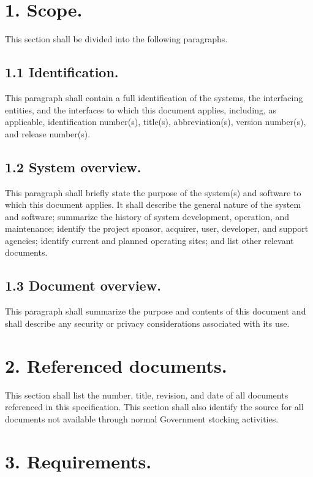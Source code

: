 \section{1. Scope.}

This section shall be divided into the following paragraphs.

\subsection{1.1 Identification.}

This paragraph shall contain a full identification of the systems, the
interfacing entities, and the interfaces to which this document applies,
including, as applicable, identification number(s), title(s),
abbreviation(s), version number(s), and release number(s).

\subsection{1.2 System overview.}

This paragraph shall briefly state the purpose of the system(s) and
software to which this document applies. It shall describe the general
nature of the system and software; summarize the history of system
development, operation, and maintenance; identify the project sponsor,
acquirer, user, developer, and support agencies; identify current and
planned operating sites; and list other relevant documents.

\subsection{1.3 Document overview.}

This paragraph shall summarize the purpose and contents of this document
and shall describe any security or privacy considerations associated
with its use.

\section{2. Referenced documents.}

This section shall list the number, title, revision, and date of all
documents referenced in this specification. This section shall also
identify the source for all documents not available through normal
Government stocking activities.

\section{3. Requirements.}

